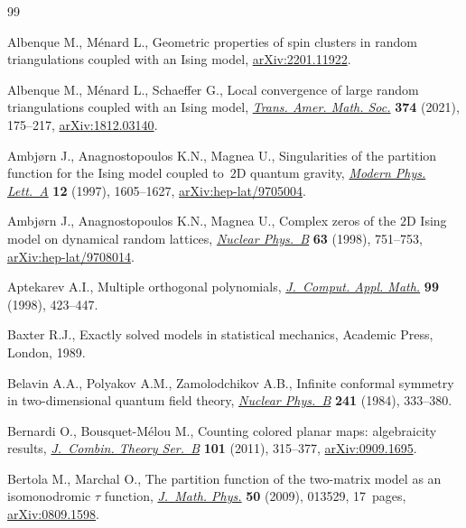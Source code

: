 \begin{thebibliography}{99}
\footnotesize\itemsep=0pt

Albenque M., M\'enard L., Geometric properties of spin clusters in random
 triangulations coupled with an {I}sing model,
 \href{http://arxiv.org/abs/2201.11922}{arXiv:2201.11922}.

Albenque M., M\'enard L., Schaeffer G., Local convergence of large random
 triangulations coupled with an {I}sing model,
 \href{https://doi.org/10.1090/tran/8150}{\textit{Trans. Amer. Math. Soc.}}
 \textbf{374} (2021), 175--217,
 \href{http://arxiv.org/abs/1812.03140}{arXiv:1812.03140}.

Ambj\o{r}n J., Anagnostopoulos K.N., Magnea U., Singularities of the partition
 function for the {I}sing model coupled to~{$2$}{D} quantum gravity,
 \href{https://doi.org/10.1142/S0217732397001643}{\textit{Modern Phys.
 Lett.~A}} \textbf{12} (1997), 1605--1627,
 \href{http://arxiv.org/abs/hep-lat/9705004}{arXiv:hep-lat/9705004}.

Ambj\o{r}n J., Anagnostopoulos K.N., Magnea U., Complex zeros of the {$2$}{D}
 {I}sing model on dynamical random lattices,
 \href{https://doi.org/10.1016/S0920-5632(97)00893-1}{\textit{Nuclear
 Phys.~B}} \textbf{63} (1998), 751--753,
 \href{http://arxiv.org/abs/hep-lat/9708014}{arXiv:hep-lat/9708014}.

Aptekarev A.I., Multiple orthogonal polynomials,
 \href{https://doi.org/10.1016/S0377-0427(98)00175-7}{\textit{J.~Comput. Appl.
 Math.}} \textbf{99} (1998), 423--447.

Baxter R.J., Exactly solved models in statistical mechanics, Academic Press,
 London, 1989.

Belavin A.A., Polyakov A.M., Zamolodchikov A.B., Infinite conformal symmetry in
 two-dimensional quantum field theory,
 \href{https://doi.org/10.1016/0550-3213(84)90052-X}{\textit{Nuclear Phys.~B}}
 \textbf{241} (1984), 333--380.

Bernardi O., Bousquet-M\'elou M., Counting colored planar maps: algebraicity
 results, \href{https://doi.org/10.1016/j.jctb.2011.02.003}{\textit{J.~Combin.
 Theory Ser.~B}} \textbf{101} (2011), 315--377,
 \href{http://arxiv.org/abs/0909.1695}{arXiv:0909.1695}.

Bertola M., Marchal O., The partition function of the two-matrix model as an
 isomonodromic {$\tau$} function,
 \href{https://doi.org/10.1063/1.3054865}{\textit{J.~Math. Phys.}} \textbf{50}
 (2009), 013529, 17~pages,
 \href{http://arxiv.org/abs/0809.1598}{arXiv:0809.1598}.


\end{thebibliography}
